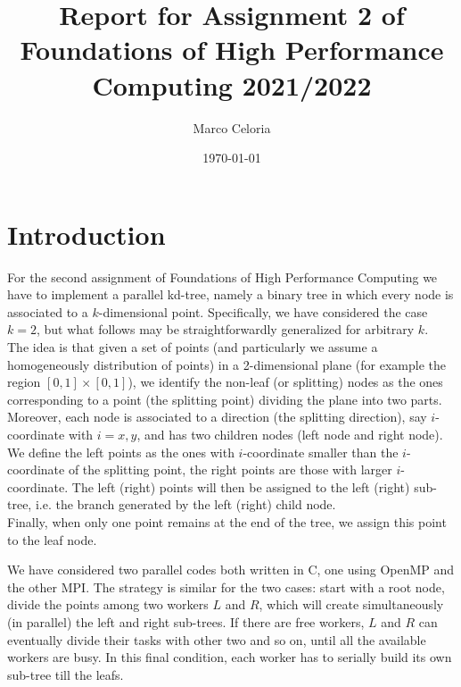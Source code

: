 \documentclass[amssymb, aps,nofootinbib, superscriptaddress, notitlepage]{revtex4}
\begin{document}
\title{Report for Assignment 2 of Foundations of High Performance Computing 2021/2022}
\date{\today}


\author{Marco Celoria}
%
\maketitle
\section{Introduction}
For the second assignment of Foundations of High Performance Computing we have to implement a parallel kd-tree, namely  a binary tree in which every node is associated to a $k$-dimensional point. Specifically, we have considered the  case $k=2$, but what follows may be straightforwardly generalized for arbitrary $k$.
\\
The idea is that given a set of points (and particularly we assume a homogeneously distribution of points) in a 2-dimensional plane (for example the region $[0,1]\times [0,1]$), we identify the non-leaf (or splitting) nodes as the ones corresponding to a point (the splitting point) dividing the plane into two parts.
Moreover, each node is associated to a direction (the splitting direction), say $i$-coordinate with $i=x,y$, and has two children nodes (left node and right node).
\\
We define the left points  as the ones with $i$-coordinate smaller than the $i$-coordinate of the splitting point, the right points are those with larger $i$-coordinate.  The left (right) points will then be assigned to the left (right) sub-tree, i.e. the branch generated by the left (right) child node. 
\\
 Finally, when only one point remains at the end of the tree, we assign this point to the leaf node.

We have considered two parallel codes both written in C, one using  OpenMP and the other  MPI.
The strategy is similar for the two cases: start with a root node, divide the points among two workers $L$ and $R$, which will create simultaneously (in parallel) the left and right sub-trees.
If there are free workers, $L$ and $R$ can eventually divide their tasks  with other two and so on, until  all the available workers are busy.
In this final condition,  each worker has to serially build its own sub-tree till the leafs.
\end{document}
